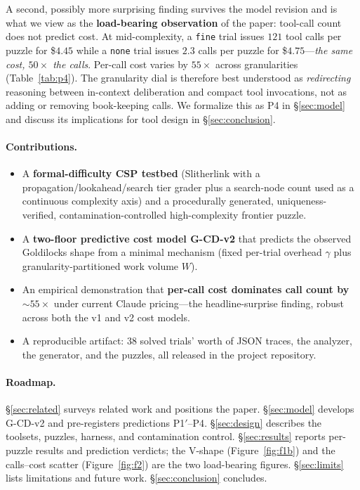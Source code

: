 \documentclass[11pt,letterpaper]{article}
\begin{document}
A second, possibly more surprising finding survives the model
revision and is what we view as the \textbf{load-bearing
observation} of the paper: tool-call count does not predict cost.
At mid-complexity, a \texttt{fine} trial issues $121$ tool calls
per puzzle for \$$4.45$ while a \texttt{none} trial issues $2.3$
calls per puzzle for \$$4.75$---\emph{the same cost,
$50\times$ the calls}. Per-call cost varies by $55\times$ across
granularities (Table~\ref{tab:p4}). The granularity dial is
therefore best understood as \emph{redirecting} reasoning between
in-context deliberation and compact tool invocations, not as adding
or removing book-keeping calls. We formalize this as \textsc{P4} in
\S\ref{sec:model} and discuss its implications for tool design in
\S\ref{sec:conclusion}.

\paragraph{Contributions.}
\begin{itemize}
  \item A \textbf{formal-difficulty CSP testbed} (Slitherlink with
    a propagation/lookahead/search tier grader plus a search-node
    count used as a continuous complexity axis) and a procedurally
    generated, uniqueness-verified, contamination-controlled
    high-complexity frontier puzzle.
  \item A \textbf{two-floor predictive cost model G-CD-v2} that
    predicts the observed Goldilocks shape from a minimal mechanism
    (fixed per-trial overhead $\gamma$ plus
    granularity-partitioned work volume $W$).
  \item An empirical demonstration that \textbf{per-call cost
    dominates call count by ${\sim}55\times$} under current Claude
    pricing---the headline-surprise finding, robust across both
    the v1 and v2 cost models.
  \item A reproducible artifact: $38$ solved trials' worth of JSON
    traces, the analyzer, the generator, and the puzzles, all
    released in the project repository.
\end{itemize}

\paragraph{Roadmap.}
\S\ref{sec:related} surveys related work and positions the paper.
\S\ref{sec:model} develops G-CD-v2 and pre-registers predictions
\textsc{P1$'$}--\textsc{P4}. \S\ref{sec:design} describes the
toolsets, puzzles, harness, and contamination control.
\S\ref{sec:results} reports per-puzzle results and prediction
verdicts; the V-shape
(Figure~\ref{fig:f1b}) and the calls--cost scatter
(Figure~\ref{fig:f2}) are the two load-bearing figures.
\S\ref{sec:limits} lists limitations and future work.
\S\ref{sec:conclusion} concludes.
\end{document}
